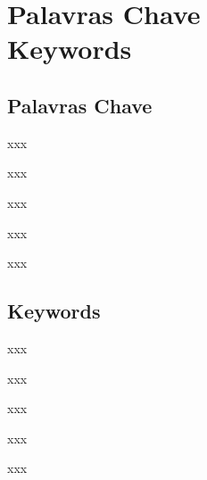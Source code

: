 \newpage


\chapter*{Palavras Chave \\ Keywords}
\thispagestyle{empty}

\section*{Palavras Chave}
{\large %

\noindent xxx

\noindent xxx

\noindent xxx

\noindent xxx

\noindent xxx

}

\section*{Keywords}

{\large %

\noindent xxx

\noindent xxx

\noindent xxx

\noindent xxx

\noindent xxx

}

\vfill


\cleardoublepage

\pagestyle{plain}

 
\def\contentsname{Contents}
\tableofcontents
\newpage

\listoffigures
\newpage

\listoftables

\cleardoublepage

